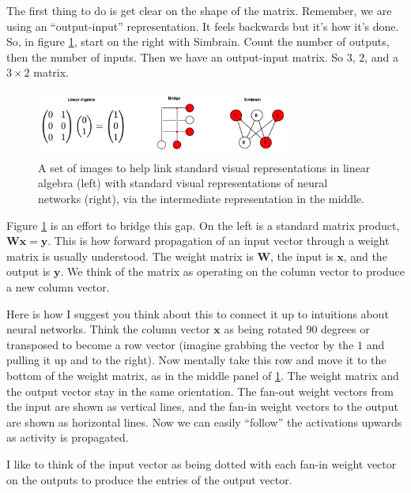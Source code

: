 The first thing to do is get clear on the shape of the matrix. Remember, we are using an ``output-input'' representation.  It feels backwards but it's how it's done.  So, in figure \ref{linalgToSimbrain}, start on the right with Simbrain.  Count the number of outputs, then the number of inputs. Then we have an output-input matrix.  So $3$, $2$, and a $3 \times 2$ matrix.

\begin{figure}[h]
\centering
\includegraphics[width=0.75\textwidth]{images/LinalgToSimbrainReps.png}
\caption[Jeff Yoshimi.]{A set of images to help link standard visual representations in linear algebra (left) with standard visual representations of neural networks (right), via the intermediate representation in the middle. }
\label{linalgToSimbrain}
\end{figure}

Figure \ref{linalgToSimbrain} is an effort to bridge this gap. On the left is a standard matrix product, $\mathbf{W} \mathbf{x} = \mathbf{y}$.  This is how forward propagation of an input vector through a weight matrix is usually understood. The weight matrix is $\mathbf{W}$, the input is $\mathbf{x}$, and the output is $\mathbf{y}$. We think of the matrix as operating on the column vector to produce a new column vector.   

Here is how I suggest you think about this to connect it up to intuitions about neural networks.  Think the column vector $\mathbf{x}$ as being rotated 90 degrees or transposed to become a row vector (imagine grabbing the vector by the $1$ and pulling it up and to the right). Now mentally take this row and move it to the bottom of the weight matrix, as in the middle panel of  \ref{linalgToSimbrain}. The weight matrix and the output vector stay in the same orientation.  The fan-out weight vectors from the input are shown as vertical lines, and the fan-in weight vectors to the output are shown as horizontal lines. Now we can easily ``follow'' the activations upwards as activity is propagated. 

I like to think of the input vector as being dotted with each fan-in weight vector on the outputs to produce the entries of the output vector.

